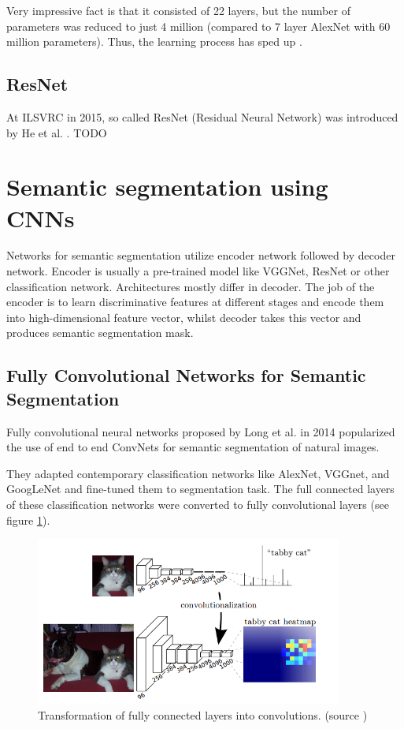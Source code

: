 Very impressive fact is that it consisted of 22 layers, but the number of
parameters was reduced to just 4 million (compared to 7 layer AlexNet with 60 million
parameters). Thus, the learning process has sped up .

\subsection{ResNet}
\label{sec:cnn_rw:resnet}

At ILSVRC in 2015, so called ResNet (Residual Neural Network) was introduced
by He et al. \cite{bib:he2016deep}. TODO

\section{Semantic segmentation using CNNs}
\label{sec:semantic_seg_cnn}

Networks for semantic segmentation utilize encoder network followed by decoder network.
Encoder is usually a pre-trained model like VGGNet, ResNet or other classification
network. Architectures mostly differ in decoder. The job of the encoder is to learn
discriminative features at different stages and encode them into high-dimensional feature
vector, whilst
decoder takes this vector and produces semantic segmentation mask.
\cite{bib:semanticsegoveryears}

\subsection{Fully Convolutional Networks for Semantic Segmentation}
\label{sec:semantic_seg_cnn:fcn}

Fully convolutional neural networks proposed by Long et al. \cite{bib:long2015fully}
in 2014
popularized the use of end to end ConvNets for semantic segmentation of natural images.

They adapted contemporary classification networks like AlexNet, VGGnet, and GoogLeNet
and fine-tuned them to segmentation task. The full connected layers of these
classification networks were converted to fully convolutional layers
(see figure \ref{img:transforming_fc_to_conv}).

\begin{figure}[h]
	\centerline{\includegraphics[width=0.9\textwidth]{images/transforming_fc_to_conv.png}}
	\caption[Transformation of fully connected layers into convolutions]{Transformation of fully connected layers into convolutions. (source \cite{bib:long2015fully})}
	\label{img:transforming_fc_to_conv}
\end{figure}


